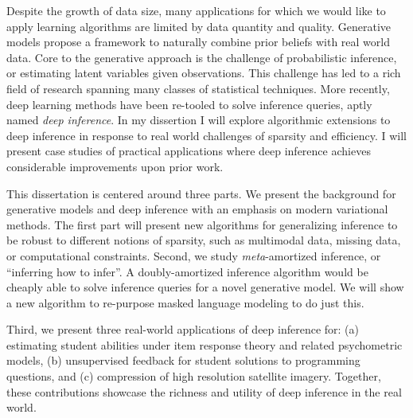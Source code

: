 Despite the growth of data size, many applications for which we would like to apply learning algorithms are limited by data quantity and quality. Generative models propose a framework to naturally combine prior beliefs with real world data. Core to the generative approach is the challenge of probabilistic inference, or estimating latent variables given observations. This challenge has led to a rich field of research spanning many classes of statistical techniques. More recently, deep learning methods have been re-tooled to solve inference queries, aptly named \textit{deep inference}. In my dissertion I will explore algorithmic extensions to deep inference in response to real world challenges of sparsity and efficiency. I will present case studies of practical applications where deep inference achieves considerable improvements upon prior work.

This dissertation is centered around three parts. We  present the background for generative models and deep inference with an emphasis on modern variational methods. The first part will present new algorithms for generalizing inference to be robust to different notions of sparsity, such as multimodal data, missing data, or computational constraints. Second, we study \textit{meta}-amortized inference, or ``inferring how to infer''. A doubly-amortized inference algorithm would be cheaply able to solve inference queries for a novel generative model. We will show a new algorithm to re-purpose masked language modeling to do just this.

Third, we present three real-world applications of deep inference for: (a) estimating student abilities under item response theory and related psychometric models, (b) unsupervised feedback for student solutions to programming questions, and (c) compression of high resolution satellite imagery. Together, these contributions showcase the richness and utility of deep inference in the real world.